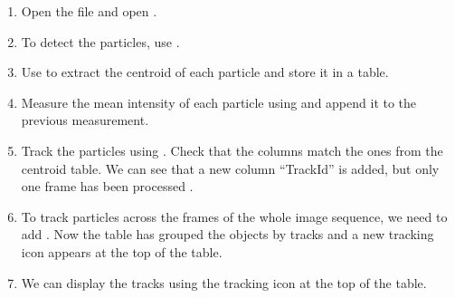 \begin{enumerate}
    \item Open the file  and open .
    \item To detect the particles, use 
    . 
    \item Use  to extract the centroid of each particle and store it in a table.
    \item Measure the mean intensity of each particle using  and append it to the previous measurement.
    \item Track the particles using . Check that the columns match the ones from the centroid table. We can see that a new column ``TrackId'' is added, but only one frame has been processed
    .
    \item To track particles across the frames of the whole image sequence, we need to add . Now the table has grouped the objects by tracks and a new tracking icon appears at the top of the table.  
    \item We can display the tracks using the tracking icon at the top of the table.
\end{enumerate}


